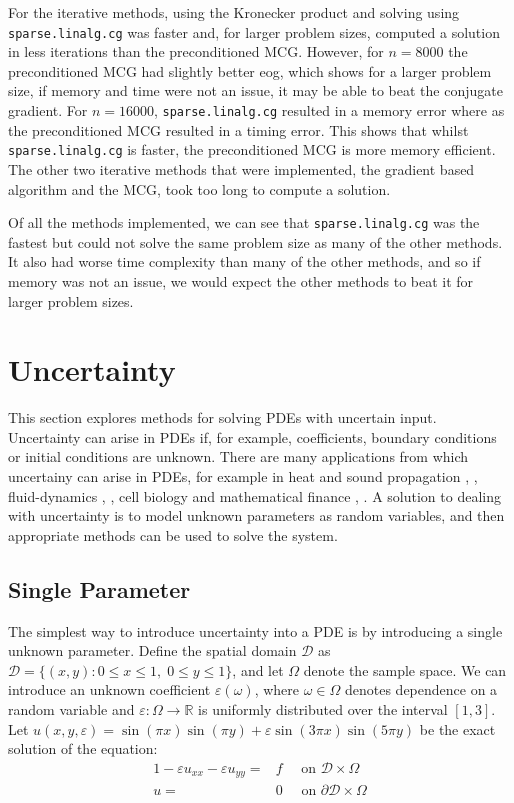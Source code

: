 \documentclass[11pt]{article}
\numberwithin{equation}{section}
\begin{document}
For the iterative methods, using the Kronecker product and solving using \texttt{sparse.linalg.cg} was faster and, for larger problem sizes, computed a solution in less iterations than the preconditioned MCG. However, for $n=8000$ the preconditioned MCG had slightly better eog, which shows for a larger problem size, if memory and time were not an issue, it may be able to beat the conjugate gradient. For $n=16000$, \texttt{sparse.linalg.cg} resulted in a memory error where as the preconditioned MCG resulted in a timing error. This shows that whilst \texttt{sparse.linalg.cg} is faster, the preconditioned MCG is more memory efficient. The other two iterative methods that were implemented, the gradient based algorithm and the MCG, took too long to compute a solution. 

Of all the methods implemented, we can see that \texttt{sparse.linalg.cg} was the fastest but could not solve the same problem size as many of the other methods. It also had worse time complexity than many of the other methods, and so if memory was not an issue, we would expect the other methods to beat it for larger problem sizes.

\newpage

\section{Uncertainty}
This section explores methods for solving PDEs with uncertain input. Uncertainty can arise in PDEs if, for example, coefficients, boundary conditions or initial conditions are unknown. There are many applications from which uncertainy can arise in PDEs, for example in heat and sound propagation \cite{Swanson}, \cite{Pryhara}, fluid-dynamics \cite{Breit}, \cite{Holm}, cell biology \cite{Bressloff} and mathematical finance \cite{Shreve03}, \cite{Shreve04}. A solution to dealing with uncertainty is to model unknown parameters as random variables, and then appropriate methods can be used to solve the system.

\subsection{Single Parameter}
The simplest way to introduce uncertainty into a PDE is by introducing a single unknown parameter. Define the spatial domain $\mathcal{D}$ as $\mathcal{D} = \{(x,y) : 0 \leq x \leq 1, \; 0 \leq y \leq 1 \}$, and let $\Omega$ denote the sample space. We can introduce an unknown coefficient $\varepsilon(\omega)$, where $\omega \in \Omega$ denotes dependence on a random variable and $\varepsilon: \Omega \rightarrow \mathbb{R}$ is uniformly distributed over the interval $[1,3]$. Let $u(x,y,\varepsilon) = \sin(\pi x)\sin(\pi y) + \varepsilon \sin(3 \pi x) \sin(5 \pi y)$ be the exact solution of the equation:
\begin{alignat}{1}
-\varepsilon u_{xx} -\varepsilon u_{yy} = {}& f \quad \text{ on } \mathcal{D} \times \Omega \nonumber \\
u = {}& 0 \quad \text{ on } \partial \mathcal{D} \times \Omega
\end{alignat}
\end{document}
